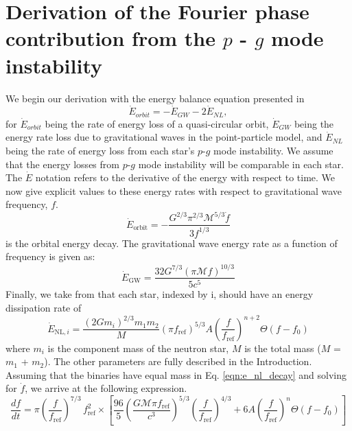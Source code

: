 \section{Derivation of the Fourier phase contribution from the $p$ - $g$ mode instability}\label{sec:fourier_phase_derivation}

We begin our derivation with the energy balance equation presented in \cite{Essick:2016tkn}
\begin{equation}\label{eqn_app:energy_bal}
\dot{E}_{orbit} = -\dot{E}_{GW} - 2 \dot{E}_{NL},
\end{equation}
for $\dot{E}_{orbit}$ being the rate of energy loss of a quasi-circular orbit, $\dot{E}_{GW}$ being the energy rate loss due to gravitational waves in the point-particle model, and $\dot{E}_{NL}$ being the rate of energy loss from each star's $p$-$g$ mode instability. We assume that the energy losses from $p$-$g$ mode instability will be comparable in each star. The $\dot{E}$ notation refers to the derivative of the energy with respect to time. We now give explicit values to these energy rates with respect to gravitational wave frequency, $f$.
\begin{equation}\label{eqn:e_orbit_decay}
\dot{E}_{\mathrm{orbit}} = - \frac{G^{2/3} \pi^{2/3} \mathcal{M}^{5/3} \dot{f}}{3 f^{1/3}}
\end{equation}
is the orbital energy decay. The gravitational wave energy rate as a function of frequency is given as:
\begin{equation}\label{eqn:e_gw_decay}
\dot{E}_{\mathrm{GW}} = \frac{32 G^{7/3} \left(\pi \mathcal{M} f\right)^{10/3}}{5 c^5}
\end{equation}
Finally, we take from \cite{Essick:2016tkn} that each star, indexed by i, should have an energy dissipation rate of
\begin{equation}\label{eqn:e_nl_decay}
\dot{E}_{\mathrm{NL}, i} = \frac{(2G m_i)^{2/3}m_1 m_2}{M} (\pi f_{\mathrm{ref}})^{5/3} A \left (\frac{f}{f_{\mathrm{ref}}} \right )^{n+2} \Theta(f - f_0) 
\end{equation}
where $m_i$ is the component mass of the neutron star, $M$ is the total mass ($M$ = $m_1$ + $m_2$). The other parameters are fully described in the Introduction. Assuming that the binaries have equal mass in Eq. \ref{eqn:e_nl_decay} and solving for $\dot{f}$, we arrive at the following expression.
\begin{equation}\label{eqn:f_dot}
\frac{df}{dt} =  \pi \left ( \frac{f}{f_{\mathrm{ref}}} \right )^{7/3} \, f_{\mathrm{ref}}^2 \times \left [ \frac{96}{5} \left ( \frac{G \mathcal{M} \pi f_{\mathrm{ref}}}{c^3}\right )^{5/3} \left (\frac{f}{f_{\mathrm{ref}}} \right )^{4/3} + 6 A \left (\frac{f}{f_{\mathrm{ref}}} \right )^{n} \Theta(f - f_0) \right ]
\end{equation}

